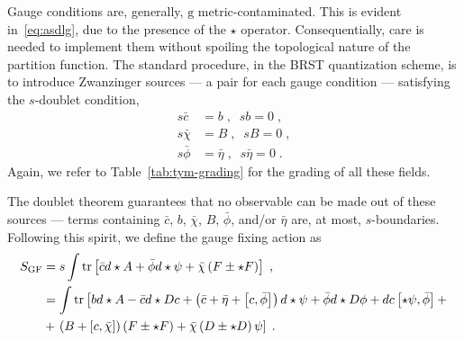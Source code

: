 \documentclass[../main/tex]{subfiles}
\begin{document}
Gauge conditions are, generally, $ \mathrm{g} $ metric-contaminated. This is evident in~\eqref{eq:asdlg}, due to the presence of the $\star$ operator. Consequentially, care is needed to implement them without spoiling the topological nature of the partition function. The standard procedure, in the BRST quantization scheme, is to introduce Zwanzinger sources --- a pair for each gauge condition --- satisfying the $s$-doublet condition,
\begin{subequations}\label{eq:anti-ghost_lautrup-nakanishi}
  \begin{align}
    s \bar{ c }  & = b \;, \;\; s b  = 0 \;,                    \\
    s \bar{\chi} & = B \;, \;\; s B        = 0 \;,              \\
    s \bar{\phi} & = \bar{\eta} \;, \;\; s \bar{ \eta } = 0 \;.
  \end{align}
\end{subequations}
Again, we refer to Table~\ref{tab:tym-grading} for the grading of all these fields.

The doublet theorem guarantees that no observable can be made out of these sources --- terms containing $\bar{c}$, $b$, $\bar{\chi}$, $B$, $\bar{\phi}$, and/or $\bar{\eta}$ are, at most, $s$-boundaries. Following this spirit, we define the gauge fixing action as
\begin{subequations}\label{eq:tym-gf-action}
  \begin{align}
    S_{\text{GF}} & = s \int \operatorname{tr} \left[ \bar{c} d \star A + \bar{\phi} d \star \psi + \bar{\chi} \left( F \pm \star F \right) \right] \;,                                                                                                            \\
                  & =  \int \operatorname{tr} \left[ b d \star A - \bar{c} d \star Dc + \left( \bar{c} + \bar{\eta} + \left[ c,\bar{\phi} \right] \right) d \star \psi + \bar{\phi} d \star D \phi + d c \left[ \star \psi ,\bar{\phi} \right] + \right. \nonumber \\
                  & + \left. \left( B + \left[ c,\bar{\chi} \right] \right) \left( F \pm \star F \right) + \bar{\chi} \left( D \pm \star D \right) \psi \right] \;.
  \end{align}
\end{subequations}
\end{document}
